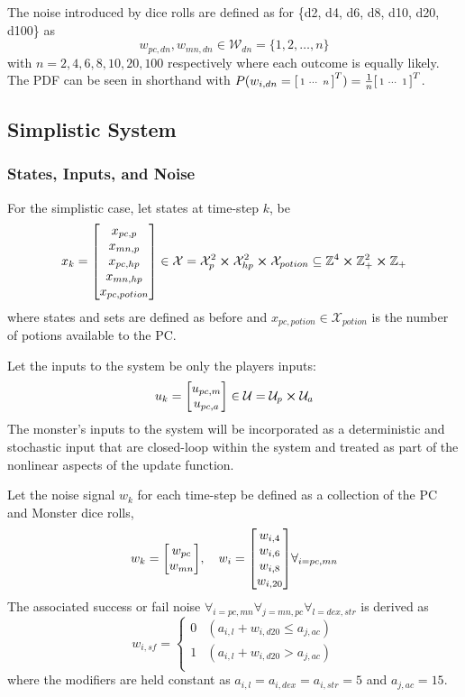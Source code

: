 \documentclass[letterpaper, 10 pt, conference]{ieeeconf}
\newcommand{\Z}{\mathbb{Z}}
\begin{document}
The noise introduced by dice rolls are defined as for \{d2, d4, d6, d8, d10, d20, d100\} as 
\[
    w_{pc,dn}, w_{mn,dn} \in \mathcal{W}_{dn} = \{1,2,\dots,n\}
\] with $n = 2,4,6,8,10,20,100$ respectively where each outcome is equally likely.
The PDF can be seen in shorthand with $P(w_{i,dn} = \smqty[1 & \cdots & n]^T) = \frac{1}{n}\smqty[1 & \cdots & 1]^T$.
% 
\subsection{Simplistic System}
\subsubsection{States, Inputs, and Noise}
For the simplistic case, let states at time-step $k$, be \[
    x_k = \mqty[x_{pc,p}\\x_{mn,p}\\x_{pc,hp}\\x_{mn,hp}\\ x_{pc,potion}] 
    \in \mathcal{X} = \mathcal{X}_p^2 \cross \mathcal{X}_{hp}^2 \cross \mathcal{X}_{potion}
    \subseteq \Z^{4} \cross \Z_{+}^{2} \cross \Z_{+}
\] where states and sets are defined as before and $x_{pc,potion} \in \mathcal{X}_{potion}$ is the number of potions available to the PC.

Let the inputs to the system be only the players inputs: \[
    u_k = \mqty[u_{pc,m}\\u_{pc,a}] \in \mathcal{U} = \mathcal{U}_{p} \cross \mathcal{U}_{a} %
\] The monster's inputs to the system will be incorporated as a deterministic and stochastic input that are closed-loop within the system and treated as part of the nonlinear aspects of the update function.

Let the noise signal $w_k$ for each time-step be defined as a collection of the PC and Monster dice rolls, \[
    w_k = \mqty[w_{pc} \\ w_{mn}], \quad w_{i} = \mqty[w_{i,4} \\ w_{i,6} \\ w_{i,8} \\ w_{i,20}] \forall_{i = pc,mn}
\]
The associated success or fail noise $\forall_{i=pc,mn} \forall_{j=mn,pc} \forall_{l = dex,str}$ is derived as \[
    w_{i,sf} = \begin{cases}
        0 & (a_{i,l} + w_{i,d20} \leq a_{j,ac})\\
        1 & (a_{i,l} + w_{i,d20} > a_{j,ac})\\
    \end{cases}
\] where the modifiers are held constant as $a_{i,l} = a_{i,dex} = a_{i,str} = 5$ and $a_{j,ac} = 15$.
\end{document}
